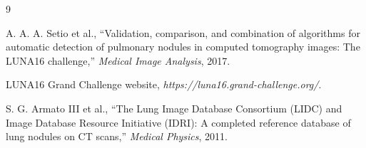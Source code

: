 \begin{thebibliography}{9}

A. A. A. Setio et al.,
``Validation, comparison, and combination of algorithms for automatic detection of pulmonary nodules in computed tomography images: The LUNA16 challenge,''
\emph{Medical Image Analysis}, 2017.

LUNA16 Grand Challenge website,
\emph{https://luna16.grand-challenge.org/}.

S. G. Armato III et al.,
``The Lung Image Database Consortium (LIDC) and Image Database Resource Initiative (IDRI): A completed reference database of lung nodules on CT scans,''
\emph{Medical Physics}, 2011.

\end{thebibliography}